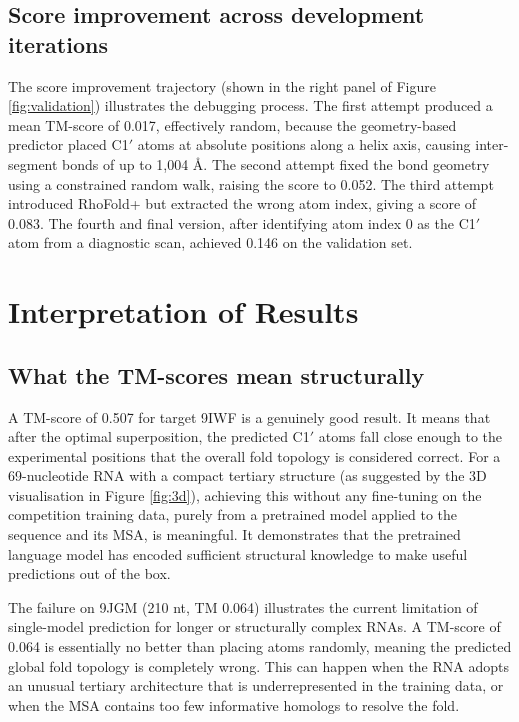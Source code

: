 \documentclass[11pt,a4paper]{article}
\begin{document}
\subsection{Score improvement across development iterations}

The score improvement trajectory (shown in the right panel of Figure \ref{fig:validation}) illustrates the debugging process. The first attempt produced a mean TM-score of 0.017, effectively random, because the geometry-based predictor placed C1$'$ atoms at absolute positions along a helix axis, causing inter-segment bonds of up to 1,004 \AA. The second attempt fixed the bond geometry using a constrained random walk, raising the score to 0.052. The third attempt introduced RhoFold+ but extracted the wrong atom index, giving a score of 0.083. The fourth and final version, after identifying atom index 0 as the C1$'$ atom from a diagnostic scan, achieved 0.146 on the validation set.

\section{Interpretation of Results}

\subsection{What the TM-scores mean structurally}

A TM-score of 0.507 for target 9IWF is a genuinely good result. It means that after the optimal superposition, the predicted C1$'$ atoms fall close enough to the experimental positions that the overall fold topology is considered correct. For a 69-nucleotide RNA with a compact tertiary structure (as suggested by the 3D visualisation in Figure \ref{fig:3d}), achieving this without any fine-tuning on the competition training data, purely from a pretrained model applied to the sequence and its MSA, is meaningful. It demonstrates that the pretrained language model has encoded sufficient structural knowledge to make useful predictions out of the box.

The failure on 9JGM (210 nt, TM 0.064) illustrates the current limitation of single-model prediction for longer or structurally complex RNAs. A TM-score of 0.064 is essentially no better than placing atoms randomly, meaning the predicted global fold topology is completely wrong. This can happen when the RNA adopts an unusual tertiary architecture that is underrepresented in the training data, or when the MSA contains too few informative homologs to resolve the fold.
\end{document}
